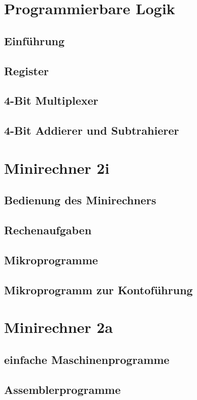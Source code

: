 \documentclass[paper=a4, fontsize=11pt]{scrartcl}
\numberwithin{equation}{section}
\numberwithin{figure}{section}
\numberwithin{table}{section}
\begin{document}
\newpage

\section{Programmierbare Logik}

\subsection{Einführung}

\subsection{Register}

\subsection{4-Bit Multiplexer}

\subsection{4-Bit Addierer und Subtrahierer}


\newpage

\section{Minirechner 2i}

\subsection{Bedienung des Minirechners}

\subsection{Rechenaufgaben}

\subsection{Mikroprogramme}

\subsection{Mikroprogramm zur Kontoführung}


\newpage

\section{Minirechner 2a}

\subsection{einfache Maschinenprogramme}

\subsection{Assemblerprogramme}
\end{document}
